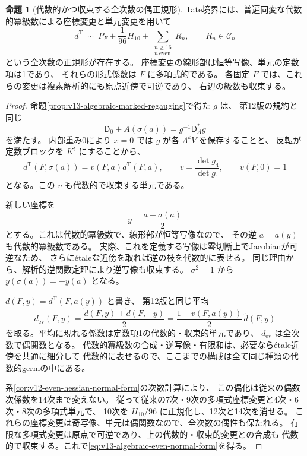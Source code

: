 \documentclass[a4paper,11pt]{ltjsarticle}
\theoremstyle{definition}
\newtheorem{theorem}{命題}[section]
\begin{document}
\begin{theorem}[代数的かつ収束する全次数の偶正規形]
\label{thm:v13-algebraic-even-normal-form}
Tate境界には、普遍同変な代数的冪級数による座標変更と単元変更を用いて
\begin{equation}\label{eq:v13-algebraic-even-normal-form}
 \boxed{\displaystyle
 d^{\mathrm T}\ \sim\
 P_F+\frac1{96}H_{10}
       +\sum_{\substack{n\ge16\\n\ \mathrm{even}}}R_n,
 \qquad R_n\in\mathcal C_n
 }
\end{equation}
という全次数の正規形が存在する。
座標変更の線形部は恒等写像、単元の定数項は1であり、
それらの形式係数は $F$ に多項式的である。
各固定 $F$ では、これらの変更は複素解析的にも原点近傍で可逆であり、
右辺の級数も収束する。
\end{theorem}
\begin{proof}
命題\ref{prop:v13-algebraic-marked-regauging}で得た $g$ は、
第12版の規約と同じ
\[
 \mathsf D_0+A(\sigma(a))=g^{-1}\mathsf D_A^*g
\]
を満たす。
内部重み0により $x=0$ では $g$ が各 $\Lambda^kV$ を保存することと、
反転が定数ブロックを $K^t$ にすることから、
\[
 d^{\mathrm T}(F,\sigma(a))
 =v(F,a)d^{\mathrm T}(F,a),\qquad
 v=\frac{\det g_4}{\det g_1},\qquad v(F,0)=1
\]
となる。この $v$ も代数的で収束する単元である。

新しい座標を
\[
 y=\frac{a-\sigma(a)}2
\]
とする。これは代数的冪級数で、線形部が恒等写像なので、
その逆 $a=a(y)$ も代数的冪級数である。
実際、これを定義する写像は零切断上でJacobianが可逆なため、
さらに\'etaleな近傍を取れば逆の枝を代数的に表せる。
同じ理由から、解析的逆関数定理により逆写像も収束する。
$\sigma^2=1$ から $y(\sigma(a))=-y(a)$ となる。

$\widetilde d(F,y)=d^{\mathrm T}(F,a(y))$ と書き、
第12版と同じ平均
\[
 d_{\mathrm{ev}}(F,y)
 =\frac{\widetilde d(F,y)+\widetilde d(F,-y)}2
 =\frac{1+v(F,a(y))}{2}\,\widetilde d(F,y)
\]
を取る。平均に現れる係数は定数項1の代数的・収束的単元であり、
$d_{\mathrm{ev}}$ は全次数で偶関数となる。
代数的冪級数の合成・逆写像・有限和は、必要なら\'etale近傍を共通に細分して
代数的に表せるので、ここまでの構成は全て同じ種類の代数的germの中にある。

系\ref{cor:v12-even-hessian-normal-form}の次数計算により、
この偶化は従来の偶数次係数を14次まで変えない。
従って従来の7次・9次の多項式座標変更と4次・6次・8次の多項式単元で、
10次を $H_{10}/96$ に正規化し、12次と14次を消せる。
これらの座標変更は奇写像、単元は偶関数なので、全次数の偶性も保たれる。
有限な多項式変更は原点で可逆であり、上の代数的・収束的変更との合成も
代数的で収束する。これで\eqref{eq:v13-algebraic-even-normal-form}を得る。
\end{proof}
\end{document}
